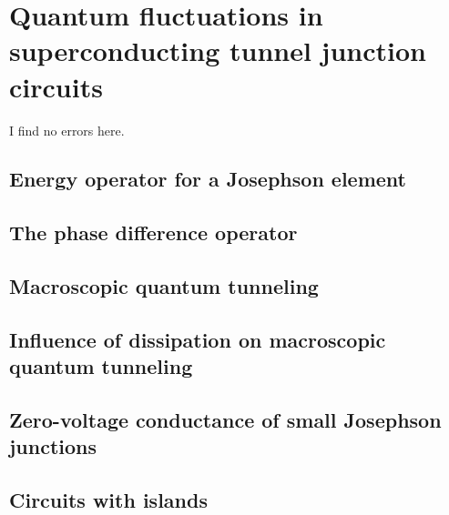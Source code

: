 \section{Quantum fluctuations in superconducting tunnel junction circuits}

I find no errors here.

\subsection{Energy operator for a Josephson element}

\subsection{The phase difference operator}

\subsection{Macroscopic quantum tunneling}

\subsection{Influence of dissipation on macroscopic quantum tunneling}

\subsection{Zero-voltage conductance of small Josephson junctions}

\subsection{Circuits with islands}
